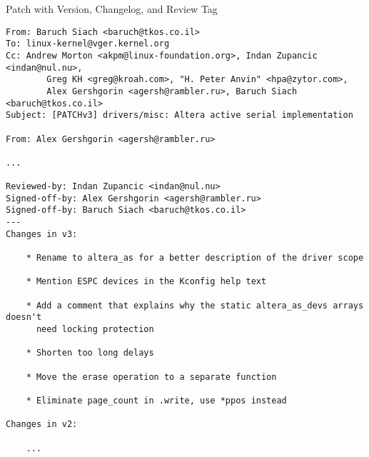 \documentclass{beamer}
\begin{document}
\begin{frame}[fragile]{Patch with Version, Changelog, and Review Tag}
  \begin{Verbatim}[fontsize=\tiny]
From: Baruch Siach <baruch@tkos.co.il>
To: linux-kernel@vger.kernel.org
Cc: Andrew Morton <akpm@linux-foundation.org>, Indan Zupancic <indan@nul.nu>,
        Greg KH <greg@kroah.com>, "H. Peter Anvin" <hpa@zytor.com>,
        Alex Gershgorin <agersh@rambler.ru>, Baruch Siach <baruch@tkos.co.il>
Subject: [PATCHv3] drivers/misc: Altera active serial implementation

From: Alex Gershgorin <agersh@rambler.ru>

...

Reviewed-by: Indan Zupancic <indan@nul.nu>
Signed-off-by: Alex Gershgorin <agersh@rambler.ru>
Signed-off-by: Baruch Siach <baruch@tkos.co.il>
---
Changes in v3:
              
    * Rename to altera_as for a better description of the driver scope
                                                                      
    * Mention ESPC devices in the Kconfig help text                   
                                                   
    * Add a comment that explains why the static altera_as_devs arrays doesn't
      need locking protection                                                 
                             
    * Shorten too long delays
                             
    * Move the erase operation to a separate function
                                                     
    * Eliminate page_count in .write, use *ppos instead

Changes in v2:

    ...
  \end{Verbatim}
\end{frame}
\end{document}
